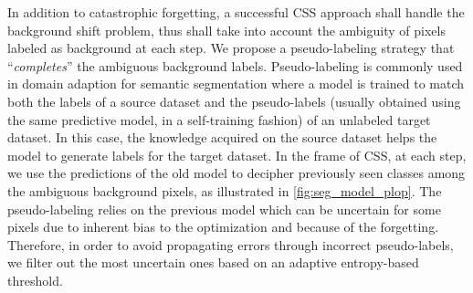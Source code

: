In addition to catastrophic forgetting, a successful \ac{CSS} approach shall handle the background
shift problem, thus shall take into account the ambiguity of pixels labeled as background at each
step. We propose a pseudo-labeling strategy that ``\textit{completes}'' the ambiguous background
labels. Pseudo-labeling \citep{lee2013pseudolabel} is commonly used in domain adaption for semantic
segmentation
\citep{vu2019advent,li2019bidirectionallearning,zou2018classbalancedselftraining,saporta2020esl}
where a model is trained to match both the labels of a source dataset and the pseudo-labels (usually
obtained using the same predictive model, in a self-training fashion) of an unlabeled target
dataset. In this case, the knowledge acquired on the source dataset helps the model to generate
labels for the target dataset. In the frame of \ac{CSS}, at each step, we use the predictions of the
old model to decipher previously seen classes among the ambiguous background pixels, as illustrated
in \autoref{fig:seg_model_plop}. The pseudo-labeling relies on the previous model which can be
uncertain for some pixels due to inherent bias to the optimization and because of the forgetting.
Therefore, in order to avoid propagating errors through incorrect pseudo-labels, we filter out the
most uncertain ones based on an adaptive entropy-based threshold.

